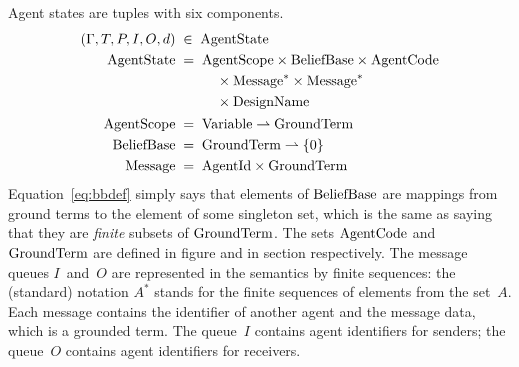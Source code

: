 \documentclass[a4paper,12pt,oneside,fleqn]{book} %
\newcommand{\pmap}{\rightharpoonup}
\begin{document}
{Agent states are tuples with six components.
\begin{align}
(\Gamma, T, P, I, O,d) &\;\in\; {\rm AgentState}
\\
{\rm AgentState} &\;=\;
  \begin{aligned}[t]
    &{\rm AgentScope} \times{\rm BeliefBase} \times{\rm AgentCode} \\
    &\quad\times{\rm Message}^* \times{\rm Message}^* \\
    &\quad\times{\rm DesignName}
  \end{aligned}
\\
{\rm AgentScope} &\;=\; {\rm Variable}\pmap{\rm GroundTerm}
\\
{\rm BeliefBase} &\;=\; {\rm GroundTerm}\pmap\{0\} \label{eq:bbdef}
\\
{\rm Message} &\;=\; {\rm AgentId}\times{\rm GroundTerm}
\end{align}
Equation~\eqref{eq:bbdef} simply says that elements of ${\rm BeliefBase}$
are mappings from ground terms to the element of some singleton set, which
is the same as saying that they are \emph{finite} subsets of ${\rm
GroundTerm}$. The sets ${\rm AgentCode}$ and ${\rm GroundTerm}$ are defined
in figure and in section respectively. The message queues $I$~and~$O$ are
represented in the semantics by finite sequences: the (standard) notation
$A^*$ stands for the finite sequences of elements from the set~$A$. Each
message contains the identifier of another agent and the message data,
which is a grounded term. The queue~$I$ contains agent identifiers for
senders; the queue~$O$ contains agent identifiers for receivers.


}
\end{document}
